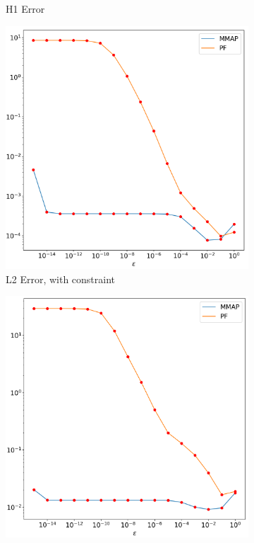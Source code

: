 \documentclass[12pt]{ociamthesis}
\begin{document}
\begin{figure}[H]
\begin{subfigure}{0.42\textwidth}
     \caption{H1 Error} \label{E2_LH_H1}
 \end{subfigure}
 \begin{subfigure}{0.42\textwidth}
     \includegraphics[width=\textwidth]{Pics/LHSims/E2/E2_INL2.png}
     \caption{L2 Error, with constraint} \label{E2_LH_L2_CON}
 \end{subfigure}
 \begin{subfigure}{0.42\textwidth}
     \includegraphics[width=\textwidth]{Pics/LHSims/E2/E2_INH1.png}

\end{subfigure}
\end{figure}
\end{document}
